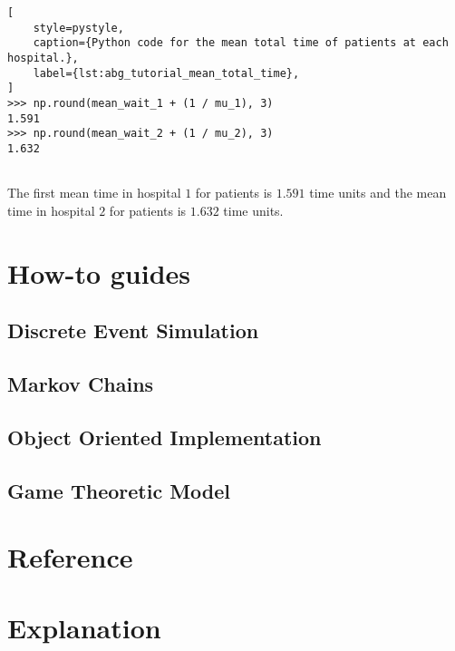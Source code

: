 \begin{lstlisting}[
    style=pystyle,
    caption={Python code for the mean total time of patients at each hospital.},
    label={lst:abg_tutorial_mean_total_time},
]
>>> np.round(mean_wait_1 + (1 / mu_1), 3)
1.591
>>> np.round(mean_wait_2 + (1 / mu_2), 3)
1.632
    
\end{lstlisting}

The first mean time in hospital \(1\) for patients is \(1.591\) time units and
the mean time in hospital \(2\) for patients is \(1.632\) time units.



\section{How-to guides}\label{sec:ambulance_game_how_to}

\subsection{Discrete Event Simulation}

\subsection{Markov Chains}

\subsection{Object Oriented Implementation} %

\subsection{Game Theoretic Model}





\section{Reference}\label{sec:ambulance_game_reference}



\section{Explanation}\label{sec:ambulance_game_explanation}

